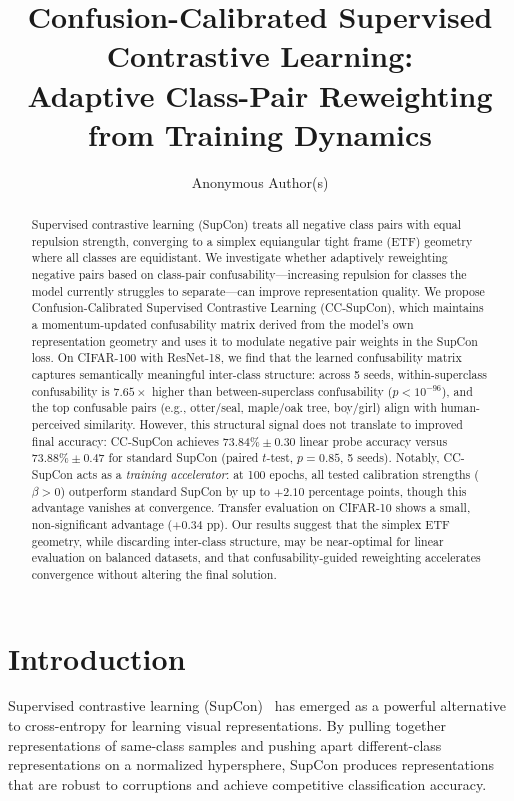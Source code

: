 \documentclass{article}
\title{Confusion-Calibrated Supervised Contrastive Learning:\\Adaptive Class-Pair Reweighting from Training Dynamics}
\author{
  Anonymous Author(s)
}
\begin{document}
\maketitle

\begin{abstract}
Supervised contrastive learning (SupCon) treats all negative class pairs with equal repulsion strength, converging to a simplex equiangular tight frame (ETF) geometry where all classes are equidistant.
We investigate whether adaptively reweighting negative pairs based on class-pair confusability---increasing repulsion for classes the model currently struggles to separate---can improve representation quality.
We propose Confusion-Calibrated Supervised Contrastive Learning (CC-SupCon), which maintains a momentum-updated confusability matrix derived from the model's own representation geometry and uses it to modulate negative pair weights in the SupCon loss.
On CIFAR-100 with ResNet-18, we find that the learned confusability matrix captures semantically meaningful inter-class structure: across 5 seeds, within-superclass confusability is $7.65\times$ higher than between-superclass confusability ($p < 10^{-96}$), and the top confusable pairs (e.g., otter/seal, maple/oak tree, boy/girl) align with human-perceived similarity.
However, this structural signal does not translate to improved final accuracy: CC-SupCon achieves $73.84\% \pm 0.30$ linear probe accuracy versus $73.88\% \pm 0.47$ for standard SupCon (paired $t$-test, $p = 0.85$, 5 seeds).
Notably, CC-SupCon acts as a \emph{training accelerator}: at 100 epochs, all tested calibration strengths ($\beta > 0$) outperform standard SupCon by up to $+2.10$ percentage points, though this advantage vanishes at convergence.
Transfer evaluation on CIFAR-10 shows a small, non-significant advantage ($+0.34$ pp).
Our results suggest that the simplex ETF geometry, while discarding inter-class structure, may be near-optimal for linear evaluation on balanced datasets, and that confusability-guided reweighting accelerates convergence without altering the final solution.
\end{abstract}

\section{Introduction}
\label{sec:intro}

Supervised contrastive learning (SupCon)~\citep{khosla2020supervised} has emerged as a powerful alternative to cross-entropy for learning visual representations. By pulling together representations of same-class samples and pushing apart different-class representations on a normalized hypersphere, SupCon produces representations that are robust to corruptions and achieve competitive classification accuracy.
\end{document}
